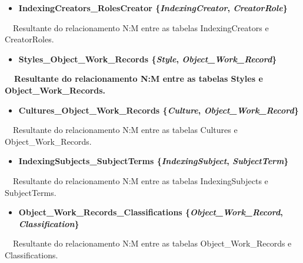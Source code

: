 \documentclass[letterpaper]{article}
\newcommand\liststyleLxv{%
\renewcommand\labelitemi{{\textbullet}}
\renewcommand\labelitemii{{\textbullet}}
\renewcommand\labelitemiii{{\textbullet}}
\renewcommand\labelitemiv{{\textbullet}}
}
\begin{document}
\bigskip

\liststyleLxv
\begin{itemize}
\item {\bfseries
IndexingCreators\_RolesCreator\textmd{
\{}\textmd{\textit{IndexingCreator}}\textmd{,
}\textmd{\textit{CreatorRole}}\textmd{\}}}
\end{itemize}
{
\ \ Resultante do relacionamento N:M entre as tabelas IndexingCreators e
CreatorRoles.}


\bigskip

\liststyleLxv
\begin{itemize}
\item {\bfseries
Styles\_Object\_Work\_Records\textmd{
\{}\textmd{\textit{Style}}\textmd{,
}\textmd{\textit{Object\_Work\_Record}}\}}
\end{itemize}
{\bfseries
\ \ \textmd{Resultante do relacionamento N:M entre as tabelas Styles e
Object\_Work\_Records.}}


\bigskip

\liststyleLxv
\begin{itemize}
\item {\bfseries
Cultures\_Object\_Work\_Records\textmd{
\{}\textmd{\textit{Culture}}\textmd{,
}\textmd{\textit{Object\_Work\_Record}}\textmd{\}}}
\end{itemize}
{
\ \ Resultante do relacionamento N:M entre as tabelas Cultures e
Object\_Work\_Records.}


\bigskip

\liststyleLxv
\begin{itemize}
\item {\bfseries
IndexingSubjects\_SubjectTerms\textmd{
\{}\textmd{\textit{IndexingSubject}}\textmd{,
}\textmd{\textit{SubjectTerm}}\textmd{\}}}
\end{itemize}
{
\ \ Resultante do relacionamento N:M entre as tabelas IndexingSubjects e
SubjectTerms.}


\bigskip

\liststyleLxv
\begin{itemize}
\item {\bfseries
Object\_Work\_Records\_Classifications\textmd{
\{}\textmd{\textit{Object\_Work\_Record}}\textmd{,
}\textmd{\textit{Classification}}\textmd{\}}}
\end{itemize}
{
\ \ Resultante do relacionamento N:M entre as tabelas
Object\_Work\_Records e Classifications.}
\end{document}
